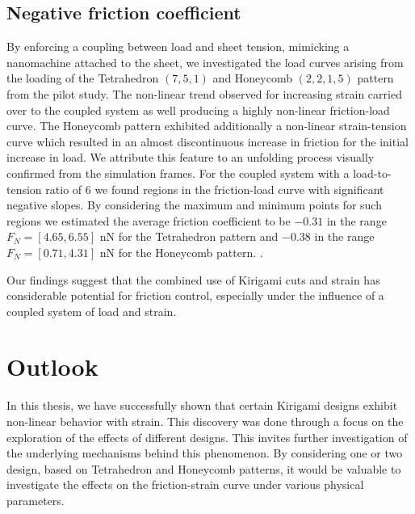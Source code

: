 \subsection{Negative friction coefficient}
By enforcing a coupling between load and sheet tension, mimicking a nanomachine
attached to the sheet, we investigated the load curves arising from the loading
of the Tetrahedron $(7,5,1)$ and Honeycomb $(2,2,1,5)$ pattern from the pilot
study. The non-linear trend observed for increasing strain carried over to the
coupled system as well producing a highly non-linear friction-load curve. The
Honeycomb pattern exhibited additionally a non-linear strain-tension curve which
resulted in an almost discontinuous increase in friction for the initial
increase in load. We attribute this feature to an unfolding process visually
confirmed from the simulation frames. For the coupled system with a
load-to-tension ratio of 6 we found regions in the friction-load curve with
significant negative slopes. By considering the maximum and minimum points for
such regions we estimated the average friction coefficient to be $-0.31$ in the
range $F_N = [4.65, 6.55]$ nN for the Tetrahedron pattern and $-0.38$ in the
range $F_N = [0.71, 4.31]$ nN for the Honeycomb pattern. .


Our findings suggest that the combined use of Kirigami cuts and strain has considerable potential for friction control, especially under the influence of a coupled system of load and strain.
\section{Outlook}
In this thesis, we have successfully shown that certain Kirigami designs exhibit non-linear behavior with strain. This discovery was done through a focus on the exploration of the effects of different designs. This invites further investigation of the underlying mechanisms behind this phenomenon. By considering one or two design, based on Tetrahedron and Honeycomb patterns, it would be valuable to investigate the effects on the friction-strain curve under various physical parameters. 

